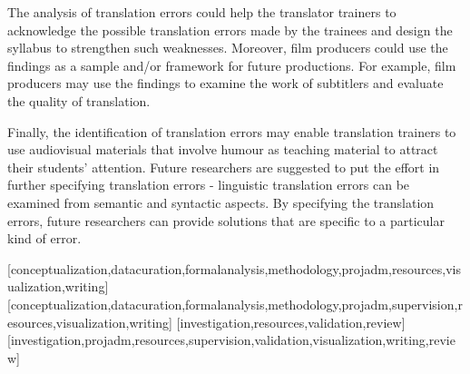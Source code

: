 \documentclass[english]{textolivre}
\begin{document}
The analysis of translation errors could help the translator trainers to acknowledge the possible translation errors made by the trainees and design the syllabus to strengthen such weaknesses.  Moreover, film producers could use the findings as a sample and/or framework for future productions. For example, film producers may use the findings to examine the work of subtitlers and evaluate the quality of translation. 

Finally, the identification of translation errors may enable translation trainers to use audiovisual materials that involve humour as teaching material to attract their students' attention. Future researchers are suggested to put the effort in further specifying translation errors - linguistic translation errors can be examined from semantic and syntactic aspects. By specifying the translation errors, future researchers can provide solutions that are specific to a particular kind of error. 


\printbibliography\label{sec-bib}

\begin{contributors}
[conceptualization,datacuration,formalanalysis,methodology,projadm,resources,visualization,writing]
[conceptualization,datacuration,formalanalysis,methodology,projadm,supervision,resources,visualization,writing]
[investigation,resources,validation,review]
[investigation,projadm,resources,supervision,validation,visualization,writing,review]
\end{contributors}
\end{document}
